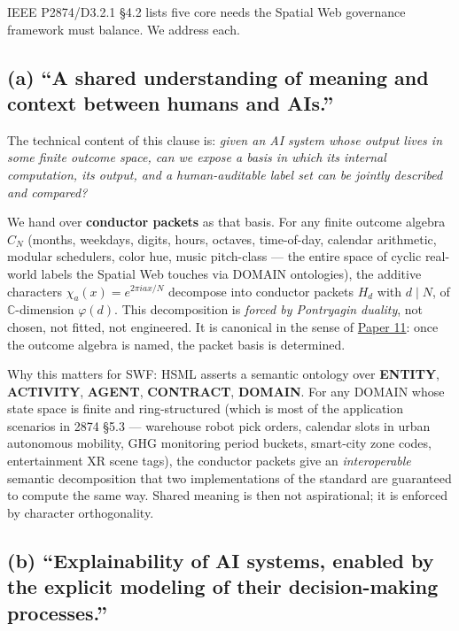 \documentclass[
  letterpaper,
  11pt]{article}
\theoremstyle{plain}
\theoremstyle{definition}
\theoremstyle{remark}
\begin{document}
IEEE P2874/D3.2.1 §4.2 lists five core needs the Spatial Web governance framework must balance. We address each.

\subsection{(a) ``A shared understanding of meaning and context between humans and AIs.''}\label{a-a-shared-understanding-of-meaning-and-context-between-humans-and-ais.}

The technical content of this clause is: \emph{given an AI system whose output lives in some finite outcome space, can we expose a basis in which its internal computation, its output, and a human-auditable label set can be jointly described and compared?}

We hand over \textbf{conductor packets} as that basis. For any finite outcome algebra \(C_N\) (months, weekdays, digits, hours, octaves, time-of-day, calendar arithmetic, modular schedulers, color hue, music pitch-class --- the entire space of cyclic real-world labels the Spatial Web touches via DOMAIN ontologies), the additive characters \(\chi_a(x) = e^{2\pi i a x / N}\) decompose into conductor packets \(H_d\) with \(d \mid N\), of \(\mathbb{C}\)-dimension \(\varphi(d)\). This decomposition is \emph{forced by Pontryagin duality}, not chosen, not fitted, not engineered. It is canonical in the sense of \href{C:/Projects/simplicial/11.quotient_character_adjacency_algebras.md}{Paper 11}: once the outcome algebra is named, the packet basis is determined.

Why this matters for SWF: HSML asserts a semantic ontology over \textbf{ENTITY}, \textbf{ACTIVITY}, \textbf{AGENT}, \textbf{CONTRACT}, \textbf{DOMAIN}. For any DOMAIN whose state space is finite and ring-structured (which is most of the application scenarios in 2874 §5.3 --- warehouse robot pick orders, calendar slots in urban autonomous mobility, GHG monitoring period buckets, smart-city zone codes, entertainment XR scene tags), the conductor packets give an \emph{interoperable} semantic decomposition that two implementations of the standard are guaranteed to compute the same way. Shared meaning is then not aspirational; it is enforced by character orthogonality.

\subsection{(b) ``Explainability of AI systems, enabled by the explicit modeling of their decision-making processes.''}\label{b-explainability-of-ai-systems-enabled-by-the-explicit-modeling-of-their-decision-making-processes.}
\end{document}
